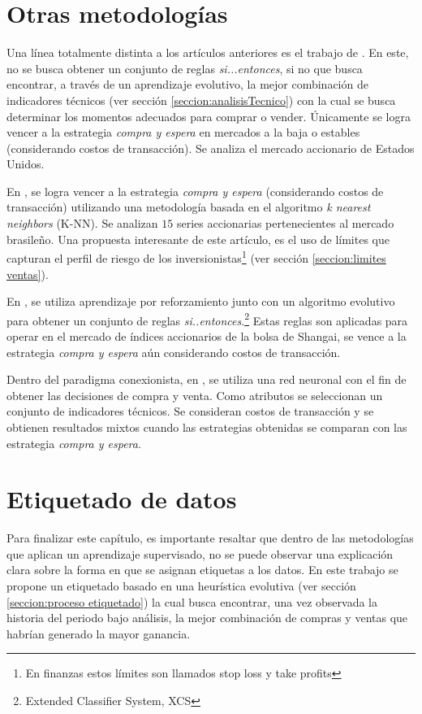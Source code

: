 \documentclass[12pt]{report}
\theoremstyle{break}
\theoremstyle{break}
\begin{document}
\section{Otras metodologías}
Una línea totalmente distinta a los artículos anteriores es el trabajo de \cite{Kaucic2010}. En este, no se busca obtener un conjunto de reglas \textit{si...entonces}, si no que busca encontrar, a través de un aprendizaje evolutivo, la mejor combinación de indicadores técnicos (ver sección \ref{seccion:analisisTecnico}) con la cual se busca determinar los momentos adecuados para comprar o vender. Únicamente se logra vencer a la estrategia \textit{compra y espera} en mercados a la baja o estables (considerando costos de transacción). Se analiza el mercado accionario de Estados Unidos.

En \cite{Teixeira2010}, se logra vencer a la estrategia \textit{compra y espera} (considerando costos de transacción) utilizando una metodología basada en el algoritmo \textit{k nearest neighbors} (K-NN). Se analizan $15$ series accionarias pertenecientes al mercado brasileño. Una propuesta interesante de este artículo, es el uso de límites que capturan el perfil de riesgo de los inversionistas\footnote{En finanzas estos límites son llamados stop loss y take profits} (ver sección \ref{seccion:limites ventas}).

En \cite{Hu2015-XCS}, se utiliza aprendizaje por reforzamiento junto con un algoritmo evolutivo para obtener un conjunto de reglas \textit{si..entonces}.\footnote{Extended Classifier System, XCS} Estas reglas son aplicadas para operar en el mercado de índices accionarios de la bolsa de Shangai, se vence a la estrategia \textit{compra y espera} aún considerando costos de transacción.

Dentro del paradigma conexionista, en \cite{Sezer2017}, se utiliza una red neuronal con el fin de obtener las decisiones de compra y venta. Como atributos se seleccionan un conjunto de indicadores técnicos. Se consideran costos de transacción y se obtienen resultados mixtos cuando las estrategias obtenidas se comparan con las estrategia \textit{compra y espera}. 

\section{Etiquetado de datos}
Para finalizar este capítulo, es importante resaltar que dentro de las metodologías que aplican un aprendizaje supervisado, no se puede observar una explicación clara sobre la forma en que se asignan etiquetas a los datos. En este trabajo se propone un etiquetado basado en una heurística evolutiva (ver sección \ref{seccion:proceso etiquetado}) la cual busca encontrar, una vez observada la historia del periodo bajo análisis, la mejor combinación de compras y ventas que habrían generado la mayor ganancia.
 
\end{document}
